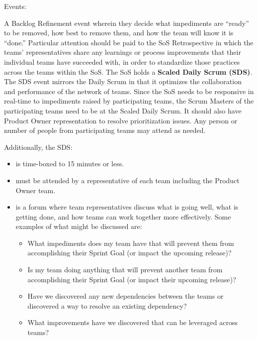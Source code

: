 \documentclass[12pt,a4paper,parskip=full]{scrartcl}
\begin{document}
Events:

A Backlog Refinement event wherein they decide what impediments are ``ready'' to be removed, how best to remove them, and how the team will know it is ``done.''
Particular attention should be paid to the SoS Retrospective in which the teams' representatives share any learnings or process improvements that their individual teams have succeeded with, in order to standardize those practices across the teams within the SoS.
The SoS holds a \textbf{Scaled Daily Scrum (SDS)}. The SDS event mirrors the Daily Scrum in that it optimizes the collaboration and performance of the network of teams. Since the SoS needs to be responsive in real-time to impediments raised by participating teams, the Scrum Masters of the participating teams need to be at the Scaled Daily Scrum. It should also have Product Owner representation to resolve prioritization issues. Any person or number of people from participating teams may attend as needed.

Additionally, the SDS:

\begin{itemize}
\item is time-boxed to 15 minutes or less.
\item must be attended by a representative of each team including the Product Owner team.
\item is a forum where team representatives discuss what is going well, what is getting done, and how teams can work together more effectively. Some examples of what might be discussed are:
\begin{itemize}
\item What impediments does my team have that will prevent them from
accomplishing their Sprint Goal (or impact the upcoming release)?
\item Is my team doing anything that will prevent another team from
accomplishing their Sprint Goal (or impact their upcoming release)?
\item Have we discovered any new dependencies between the teams or
discovered a way to resolve an existing dependency?
\item What improvements have we discovered that can be leveraged across teams?
\end{itemize}
\end{itemize}
\end{document}
